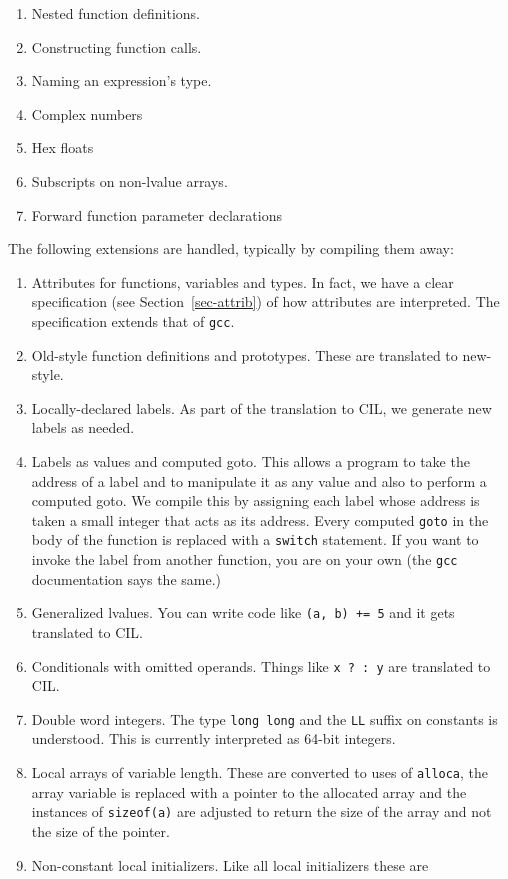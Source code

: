 \documentclass[letterpaper]{article}
\def\secref#1{Section~\ref{sec-#1}}
\def\t#1{{\tt #1}}
\begin{document}
\begin{enumerate}
\item Nested function definitions.
\item Constructing function calls.
\item Naming an expression's type.
\item Complex numbers
\item Hex floats
\item Subscripts on non-lvalue arrays.
\item Forward function parameter declarations
\end{enumerate}

 The following extensions are handled, typically by compiling them away:
\begin{enumerate}
\item Attributes for functions, variables and types. In fact, we have a clear
specification (see \secref{attrib}) of how attributes are interpreted. The
specification extends that of \t{gcc}.
\item Old-style function definitions and prototypes. These are translated to
new-style.
\item Locally-declared labels. As part of the translation to CIL, we generate
new labels as needed.
\item Labels as values and computed goto. This allows a program to take the
address of a label and to manipulate it as any value and also to perform a
computed goto. We compile this by assigning each label whose address is taken
a small integer that acts as its address. Every computed \t{goto} in the body
of the function is replaced with a \t{switch} statement. If you want to invoke
the label from another function, you are on your own (the \t{gcc}
documentation says the same.)
\item Generalized lvalues. You can write code like \t{(a, b) += 5} and it gets
translated to CIL.
\item Conditionals with omitted operands. Things like \t{x ? : y} are
translated to CIL.
\item Double word integers. The type \t{long long} and the \t{LL} suffix on
constants is understood. This is currently interpreted as 64-bit integers.
\item Local arrays of variable length. These are converted to uses of
\t{alloca}, the array variable is replaced with a pointer to the allocated
array and the instances of \t{sizeof(a)} are adjusted to return the size of
the array and not the size of the pointer.
\item Non-constant local initializers. Like all local initializers these are

\end{enumerate}
\end{document}
